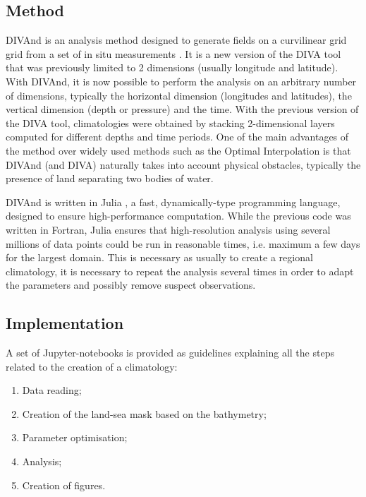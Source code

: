 \documentclass[essd, manuscript]{copernicus}
\begin{document}
\subsection{Method}

DIVAnd is an analysis method designed to generate fields on a curvilinear grid grid from a set of in situ measurements \citep{BARTH2014}. It is a new version of the DIVA tool \citep{TROUPIN2012,BECKERS2014} that was previously limited to 2 dimensions (usually longitude and latitude). With DIVAnd, it is now possible to perform the analysis on an arbitrary number of dimensions, typically the horizontal dimension (longitudes and latitudes), the vertical dimension (depth or pressure) and the time. With the previous version of  the DIVA tool, climatologies were obtained by stacking 2-dimensional layers computed for different depths and time periods. 
One of the main advantages of the method over widely used methods such as the Optimal Interpolation \citep[OI,][]{GANDIN1966,BRETHERTON1976} is that DIVAnd (and DIVA) naturally takes into account physical obstacles, typically the presence of land separating two bodies of water.  

DIVAnd is written in Julia \citep{Bezanson2017}, a fast, dynamically-type programming language, designed to ensure high-performance computation. While the previous code was written in Fortran, Julia ensures that high-resolution analysis using several millions of data points could be run in reasonable times, i.e. maximum a few days for the largest domain. This is necessary as usually to create a regional climatology, it is necessary to repeat the analysis several times in order to adapt the parameters and possibly remove suspect observations.

\subsection{Implementation}

\citep{TROUPIN2025}
A set of Jupyter-notebooks \citep[https://jupyter.org][]{KLUYVER2016} is
provided as guidelines explaining all the steps related to the creation of a climatology:
\begin{enumerate}
\item Data reading;
\item Creation of the land-sea mask based on the bathymetry;
\item Parameter optimisation;
\item Analysis;
\item Creation of figures.
\end{enumerate}
\end{document}
